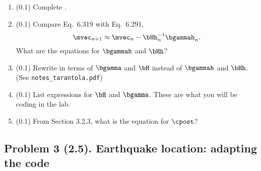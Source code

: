 \documentclass[11pt,titlepage,fleqn]{article}
\begin{document}
\begin{enumerate}
\begin{enumerate}
\vspace{1cm}

\item (0.1) Complete .

\item (0.1) Compare Eq.~6.319 with Eq.~6.291,
%
\begin{equation}
\mvec_{n+1} \approx \mvec_{n} - \bHh^{-1}_n \bgammah_n.
\label{mn}
\end{equation}
%
What are the equations for $\bgammah$ and $\bHh$?

\vspace{1cm}

\item (0.1) Rewrite  in terms of $\bgamma$ and $\bH$ instead of $\bgammah$ and $\bHh$. \\ (See \verb+notes_tarantola.pdf+)

\vspace{1cm}

\item (0.1) List expressions for $\bH$ and $\bgamma$. These are what you will be coding in the lab.

\vspace{1cm}

\item (0.1) From Section 3.2.3, what is the equation for $\cpost$?

\vspace{1cm}

\end{enumerate}

\end{enumerate}


\subsection*{Problem 3 (2.5). Earthquake location: adapting the code}
\end{document}
